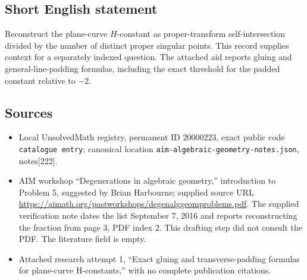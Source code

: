 \documentclass[11pt]{article}
\begin{document}
\subsection{Short English statement}
Reconstruct the plane-curve \(H\)-constant as proper-transform self-intersection divided by the number of distinct proper singular points. This record supplies context for a separately indexed question. The attached aid reports gluing and general-line-padding formulas, including the exact threshold for the padded constant relative to \(-2\).
\subsection{Sources}
\begin{itemize}
\item Local UnsolvedMath registry, permanent ID \(20000223\), exact public code \texttt{catalogue entry}; canonical location \texttt{aim-algebraic-geometry-notes.json}, notes[222].
\item AIM workshop ``Degenerations in algebraic geometry,'' introduction to Problem 5, suggested by Brian Harbourne; supplied source URL \url{https://aimath.org/pastworkshops/degenalggeomproblems.pdf}. The supplied verification note dates the list September 7, 2016 and reports reconstructing the fraction from page 3, PDF index 2. This drafting step did not consult the PDF. The literature field is empty.
\item Attached research attempt 1, ``Exact gluing and transverse-padding formulas for plane-curve H-constants,'' with no complete publication citations.
\end{itemize}
\end{document}
